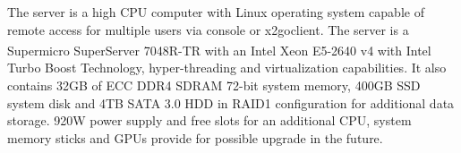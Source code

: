 	The server is a high CPU computer with Linux operating system capable of remote access for multiple users via console or x2goclient. The server is a Supermicro SuperServer 7048R-TR with an Intel\textsuperscript{\tiny\textregistered} Xeon\textsuperscript{\tiny\textregistered} E5-2640 v4 with Intel\textsuperscript{\tiny\textregistered} Turbo Boost Technology, hyper-threading and virtualization capabilities. It also contains 32GB of ECC DDR4 SDRAM 72-bit system memory, 400GB SSD system disk and 4TB SATA 3.0 HDD in RAID1 configuration for additional data storage. 920W power supply and free slots for an additional CPU, system memory sticks and GPUs provide for possible upgrade in the future.
